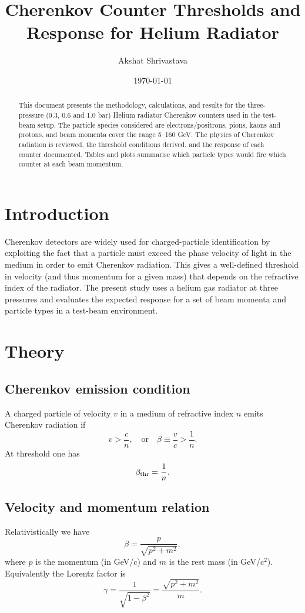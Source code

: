 \documentclass[11pt,a4paper]{article}
\title{Cherenkov Counter Thresholds and Response for Helium Radiator}
\author{Akshat Shrivastava}
\date{\today}
\begin{document}
\maketitle

\begin{abstract}
This document presents the methodology, calculations, and results for the three-pressure (0.3, 0.6 and 1.0 bar) Helium radiator Cherenkov counters used in the test-beam setup. The particle species considered are electrons/positrons, pions, kaons and protons, and beam momenta cover the range 5--160 GeV. The physics of Cherenkov radiation is reviewed, the threshold conditions derived, and the response of each counter documented. Tables and plots summarise which particle types would fire which counter at each beam momentum.
\end{abstract}

\section{Introduction}
Cherenkov detectors are widely used for charged-particle identification by exploiting the fact that a particle must exceed the phase velocity of light in the medium in order to emit Cherenkov radiation. This gives a well-defined threshold in velocity (and thus momentum for a given mass) that depends on the refractive index of the radiator. The present study uses a helium gas radiator at three pressures and evaluates the expected response for a set of beam momenta and particle types in a test-beam environment.

\section{Theory}
\subsection{Cherenkov emission condition}
A charged particle of velocity $v$ in a medium of refractive index $n$ emits Cherenkov radiation if
\[
v > \frac{c}{n}, 
\quad\text{or}\quad
\beta \equiv \frac{v}{c} > \frac{1}{n}.
\]
At threshold one has
\[
\beta_{\rm thr} = \frac{1}{n}.
\]

\subsection{Velocity and momentum relation}
Relativistically we have
\[
\beta = \frac{p}{\sqrt{p^2 + m^2}},
\]
where $p$ is the momentum (in GeV/c) and $m$ is the rest mass (in GeV/c$^2$). Equivalently the Lorentz factor is
\[
\gamma = \frac{1}{\sqrt{1 - \beta^2}}
      = \frac{\sqrt{p^2 + m^2}}{m}.
\]
\end{document}
